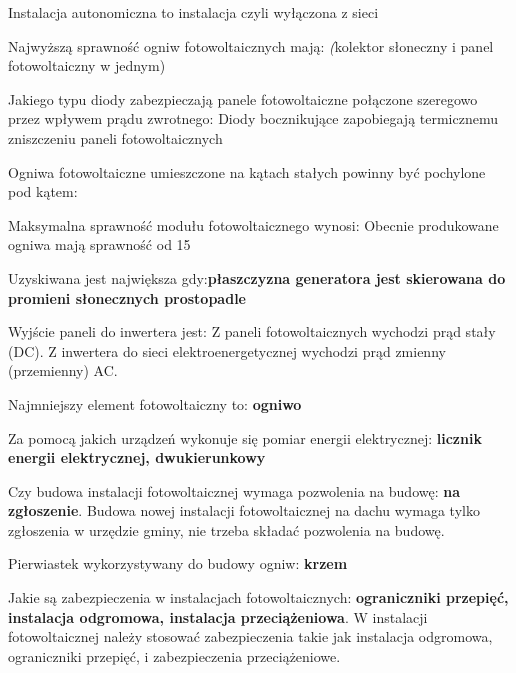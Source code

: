 \documentclass[12pt,a4paper]{article}
\begin{document}
Instalacja autonomiczna to instalacja \textbf{} czyli wyłączona z sieci 

Najwyższą sprawność ogniw fotowoltaicznych mają: \textbf{} \textit(kolektor słoneczny i panel fotowoltaiczny w jednym)

Jakiego typu diody zabezpieczają panele fotowoltaiczne połączone szeregowo przez wpływem prądu zwrotnego: \textbf{}Diody bocznikujące zapobiegają termicznemu zniszczeniu paneli fotowoltaicznych


Ogniwa fotowoltaiczne umieszczone na kątach stałych powinny być pochylone  pod kątem: \textbf{}

Maksymalna sprawność modułu fotowoltaicznego wynosi: \textbf{} Obecnie produkowane ogniwa mają sprawność od 15%

Uzyskiwana \textbf{} jest największa gdy:\textbf{płaszczyzna generatora jest skierowana do promieni słonecznych prostopadle}

Wyjście paneli do inwertera jest:  \textbf{} Z paneli fotowoltaicznych wychodzi prąd stały (DC). Z inwertera do sieci elektroenergetycznej wychodzi prąd zmienny (przemienny) AC.

Najmniejszy element fotowoltaiczny to: \textbf{ogniwo}

Za pomocą jakich urządzeń wykonuje się pomiar energii elektrycznej: \textbf{licznik energii elektrycznej, dwukierunkowy}

Czy budowa instalacji fotowoltaicznej wymaga pozwolenia na budowę:  \textbf{na zgłoszenie}. Budowa nowej instalacji fotowoltaicznej na dachu wymaga tylko zgłoszenia w urzędzie gminy, nie trzeba składać pozwolenia na budowę.

Pierwiastek wykorzystywany do budowy ogniw: \textbf{krzem}

Jakie są zabezpieczenia w instalacjach fotowoltaicznych: \textbf{ograniczniki przepięć, instalacja odgromowa, instalacja przeciążeniowa}. W instalacji fotowoltaicznej należy stosować zabezpieczenia takie jak instalacja odgromowa, ograniczniki przepięć, i zabezpieczenia przeciążeniowe.
\end{document}
